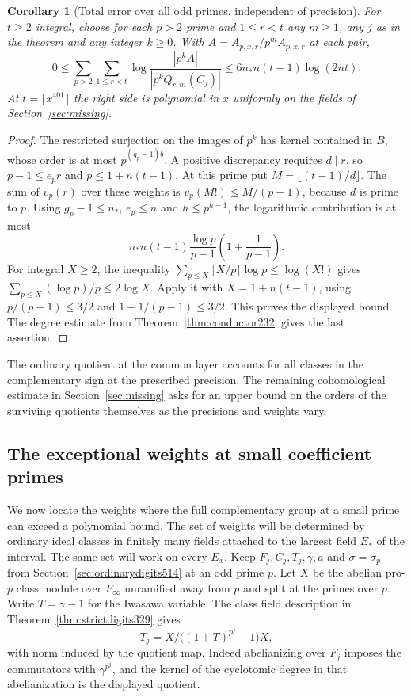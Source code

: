 \documentclass[a4paper,11pt]{article}
\newtheorem{corollary}[proposition]{Corollary}
\theoremstyle{definition}
\theoremstyle{remark}
\numberwithin{equation}{section}
\begin{document}
\begin{corollary}[Total error over all odd primes, independent of precision]
\leavevmode\label{cor:allprimes514}
For \(t\ge2\) integral, choose for each \(p>2\) prime and \(1\le r<t\)
any \(m\ge1\), any \(j\) as in the theorem and any integer \(k\ge0\).
With \(A=A_{p,x,r}/p^m A_{p,x,r}\) at each pair,
\[
 0\le\sum_{p>2}\sum_{1\le r<t}
     \log\frac{|p^k A|}{|p^k Q_{r,m}(C_j)|}
 \le 6 n_* n(t-1)\log(2nt).
\]
At \(t=\lfloor x^{401}\rfloor\) the right side is polynomial in \(x\)
uniformly on the fields of Section~\ref{sec:missing}.
\end{corollary}
\begin{proof}
The restricted surjection on the images of \(p^k\) has kernel
contained in \(B\), whose order is at most \(p^{(g_p-1)b}\).
A positive discrepancy requires \(d\mid r\), so \(p-1\le e_p r\)
and \(p\le 1+n(t-1)\). At this prime put \(M=\lfloor(t-1)/d\rfloor\).
The sum of \(v_p(r)\) over these weights is
\(v_p(M!)\le M/(p-1)\), because \(d\) is prime to \(p\).
Using \(g_p-1\le n_*\), \(e_p\le n\) and \(h\le p^{h-1}\), the
logarithmic contribution is at most
\[
 n_*n(t-1)\frac{\log p}{p-1}\left(1+\frac1{p-1}\right).
\]
For integral \(X\ge2\), the inequality
\(\sum_{p\le X}\lfloor X/p\rfloor\log p\le\log(X!)\)
gives \(\sum_{p\le X}(\log p)/p\le2\log X\).
Apply it with \(X=1+n(t-1)\), using \(p/(p-1)\le3/2\) and
\(1+1/(p-1)\le3/2\). This proves the displayed bound. The degree
estimate from Theorem~\ref{thm:conductor232} gives the last assertion.
\end{proof}

The ordinary quotient at the common layer accounts for all classes
in the complementary sign at the prescribed precision. The remaining
cohomological estimate in Section~\ref{sec:missing} asks for an upper
bound on the orders of the surviving quotients themselves as the
precisions and weights vary.


\subsection{The exceptional weights at small coefficient primes}
\label{sec:finiteweights515}

We now locate the weights where the full complementary group at
a small prime can exceed a polynomial bound. The set of weights
will be determined by ordinary ideal classes in finitely many
fields attached to the largest field \(E_*\) of the interval. The
same set will work on every \(E_x\). Keep \(F_j,C_j,T_j,\gamma,a\)
and \(\sigma=\sigma_p\) from Section~\ref{sec:ordinarydigits514}
at an odd prime \(p\). Let \(X\) be the abelian pro-\(p\) class
module over \(F_\infty\) unramified away from \(p\) and split at
the primes over \(p\). Write \(T=\gamma-1\) for the Iwasawa
variable. The class field description in
Theorem~\ref{thm:strictdigits329} gives
\[
       T_j=X/\big((1+T)^{p^j}-1\big)X ,
\]
with norm induced by the quotient map. Indeed abelianizing over
\(F_j\) imposes the commutators with \(\gamma^{p^j}\), and the
kernel of the cyclotomic degree in that abelianization is the
displayed quotient.
\end{document}
